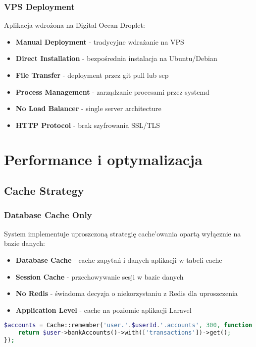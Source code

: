     \subsubsection{VPS Deployment}
    Aplikacja wdrożona na Digital Ocean Droplet:

    \begin{itemize}
        \item \textbf{Manual Deployment} - tradycyjne wdrażanie na VPS
        \item \textbf{Direct Installation} - bezpośrednia instalacja na Ubuntu/Debian
        \item \textbf{File Transfer} - deployment przez git pull lub scp
        \item \textbf{Process Management} - zarządzanie procesami przez systemd
        \item \textbf{No Load Balancer} - single server architecture
        \item \textbf{HTTP Protocol} - brak szyfrowania SSL/TLS
    \end{itemize}

    \section{Performance i optymalizacja}

    \subsection{Cache Strategy}

    \subsubsection{Database Cache Only}
    System implementuje uproszczoną strategię cache'owania opartą wyłącznie na bazie danych:

    \begin{itemize}
        \item \textbf{Database Cache} - cache zapytań i danych aplikacji w tabeli cache
        \item \textbf{Session Cache} - przechowywanie sesji w bazie danych
        \item \textbf{No Redis} - świadoma decyzja o niekorzystaniu z Redis dla uproszczenia
        \item \textbf{Application Level} - cache na poziomie aplikacji Laravel
    \end{itemize}

    \begin{lstlisting}[language=PHP, caption=Przykład cache'owania]
$accounts = Cache::remember('user.'.$userId.'.accounts', 300, function () use ($user) {
    return $user->bankAccounts()->with(['transactions'])->get();
});
    \end{lstlisting}

